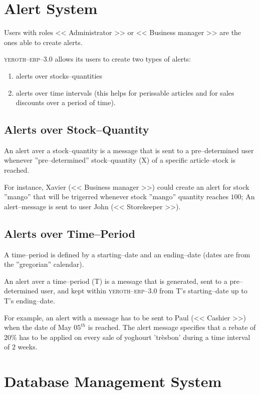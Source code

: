 \documentclass[a4paper, 10pt, twocolumn]{article}
\newcommand{\yeren}{\textsc{yeroth--erp--3.0}\xspace}
\newcommand{\administrator}{<< Administrator >>\xspace}
\newcommand{\manager}{<< Business manager >>\xspace}
\newcommand{\storekeeper}{<< Storekeeper >>\xspace}
\newcommand{\cashier}{<< Cashier >>\xspace}
\begin{document}
\section{Alert System}
\vspace{-0.3em}
Users with roles \administrator or \manager
are the ones able to create alerts.

\yeren allows its users to create two
types of alerts:
\begin{enumerate}[1)]
	\itemsep -0.5em
  \item alerts over stocks--quantities
  \item alerts over time intervals (this helps for
	  perissable articles and for sales discounts
	  over a period of time).
\end{enumerate}

\subsection{Alerts over Stock--Quantity}

An alert aver a stock--quantity is a message that
is sent to a pre--determined user whenever
''pre--determined'' stock--quantity (X) of
a specific article--stock is reached.

For instance, Xavier (\manager) could create
an alert for stock ''mango'' that will be
trigerred whenever stock ''mango'' quantity
reaches $100$; An alert--message is sent
to user John (\storekeeper).

\subsection{Alerts over Time--Period}

A time--period is defined by a
starting--date and an ending--date
(dates are from the ''gregorian'' calendar).

An alert aver a time--period (T) is a message
that is generated, sent to a pre--determined user,
and kept within \yeren from T's starting--date 
up to T's ending--date.

For example, an alert with a message has to be
sent to Paul (\cashier) when the date of May
$05^{th}$ is reached. The alert message
specifies that a rebate of $20\%$ has to be applied
on every sale of yoghourt 'tr\`esbon' during a
time interval of $2$ weeks.


\section{Database Management System}
\end{document}
